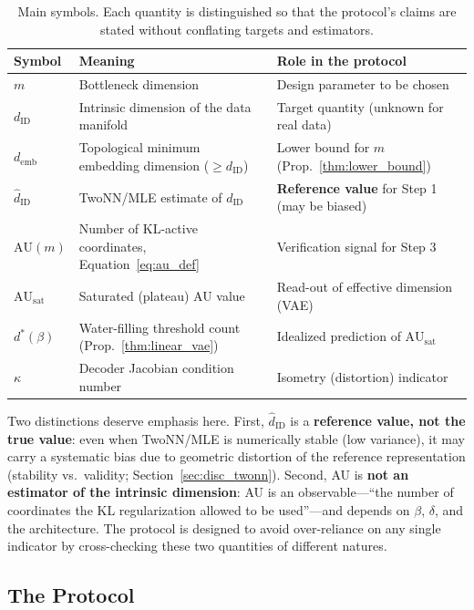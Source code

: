 \documentclass[make,article,submit,pdftex,moreauthors]{Definitions/mdpi}
\newcommand{\dID}{d_{\mathrm{ID}}}
\newcommand{\hatdID}{\hat{d}_{\mathrm{ID}}}
\newcommand{\kap}{\kappa}
\newcommand{\AUsat}{\mathrm{AU}_{\mathrm{sat}}}
\newcommand{\demb}{d_{\mathrm{emb}}}
\newcommand{\dstar}{d^{*}(\beta)}
\begin{document}
\begin{table}[H]
\caption{Main symbols. Each quantity is distinguished so that the protocol's
claims are stated without conflating targets and estimators.}
\label{tab:notation}
\small
\begin{tabular}{lp{5.6cm}p{4.9cm}}
\toprule
\textbf{Symbol} & \textbf{Meaning} & \textbf{Role in the protocol} \\
\midrule
$m$ & Bottleneck dimension & Design parameter to be chosen \\
$\dID$ & Intrinsic dimension of the data manifold & Target quantity (unknown for real data) \\
$\demb$ & Topological minimum embedding dimension ($\geq \dID$) & Lower bound for $m$ (Prop.~\ref{thm:lower_bound}) \\
$\hatdID$ & TwoNN/MLE estimate of $\dID$ & \textbf{Reference value} for Step 1 (may be biased) \\
$\mathrm{AU}(m)$ & Number of KL-active coordinates, Equation~\eqref{eq:au_def} & Verification signal for Step 3 \\
$\AUsat$ & Saturated (plateau) AU value & Read-out of effective dimension (VAE) \\
$\dstar$ & Water-filling threshold count (Prop.~\ref{thm:linear_vae}) & Idealized prediction of $\AUsat$ \\
$\kap$ & Decoder Jacobian condition number & Isometry (distortion) indicator \\
\bottomrule
\end{tabular}
\end{table}

Two distinctions deserve emphasis here.
First, $\hatdID$ is a \textbf{reference value, not the true value}: even
when TwoNN/MLE is numerically stable (low variance), it may carry a
systematic bias due to geometric distortion of the reference representation
(stability vs.\ validity; Section~\ref{sec:disc_twonn}).
Second, AU is \textbf{not an estimator of the intrinsic dimension}: AU is an
observable---``the number of coordinates the KL regularization allowed to be
used''---and depends on $\beta$, $\delta$, and the architecture.
The protocol is designed to avoid over-reliance on any single indicator by
cross-checking these two quantities of different natures.

\subsection{The Protocol}\label{sec:protocol_main}
\end{document}
